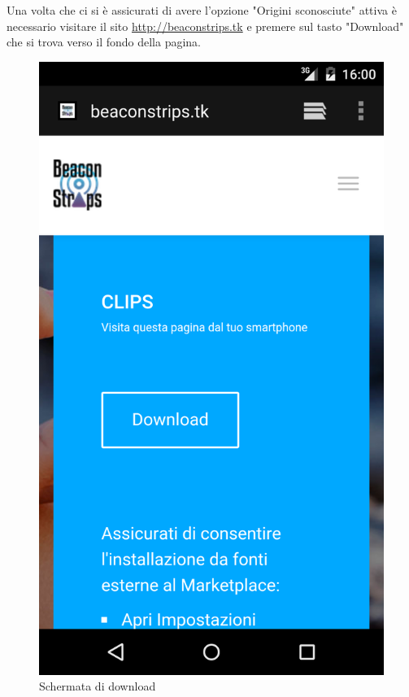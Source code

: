 Una volta che ci si è assicurati di avere l'opzione "Origini sconosciute" attiva è necessario visitare il sito \url{http://beaconstrips.tk} e premere sul tasto "Download" che si trova verso il fondo della pagina.

\begin{figure}[!h]
	\centering
	\includegraphics[scale=0.10]{screenshot/download}
	\caption{Schermata di download}
\end{figure}

